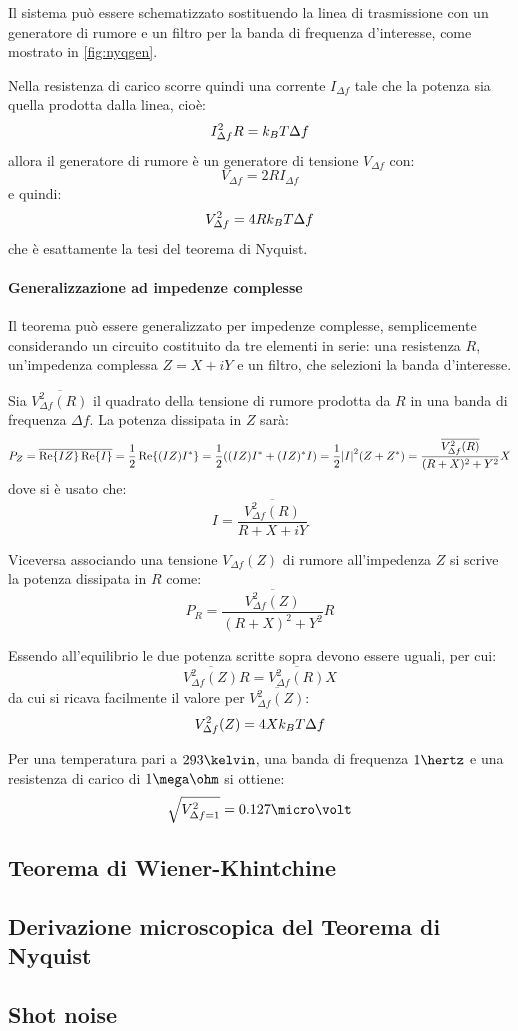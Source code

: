 Il sistema può essere schematizzato sostituendo la linea di trasmissione con un generatore di rumore e un filtro per la banda di frequenza d'interesse, come mostrato in \cref{fig:nyqgen}.

Nella resistenza di carico scorre quindi una corrente $ I_{\Delta f} $ tale che la potenza sia quella prodotta dalla linea, cioè:
\[ I_{\Delta f}^2 R = k_B T \Delta f \]
allora il generatore di rumore è un generatore di tensione $ V_{\Delta f} $ con:
\[ V_{\Delta f} = 2 R I_{\Delta f} \]
e quindi:
\[ V_{\Delta f}^2 = 4 R k_B T \Delta f \]
che è esattamente la tesi del teorema di Nyquist.

\paragraph{Generalizzazione ad impedenze complesse} Il teorema può essere generalizzato per impedenze complesse, semplicemente considerando un circuito costituito da tre elementi in serie: una resistenza $ R $, un'impedenza complessa $ Z = X + i Y $ e un filtro, che selezioni la banda d'interesse.

Sia $ \overline{V_{\Delta f}^2(R)} $ il quadrato della tensione di rumore prodotta da $ R $ in una banda di frequenza $ \Delta f $. La potenza dissipata in $ Z $ sarà:
\[ P_Z = \overline{\Re\{IZ\} \Re\{I\}} = \frac{1}{2} \Re\{(IZ) I^\ast\} = \frac{1}{2} ((IZ) I^\ast + (IZ)^\ast I) = \frac{1}{2}\abs{I}^2 (Z + Z^\ast) = \frac{\overline{V_{\Delta f}^2(R)}}{(R+X)^2 + Y^2}X\]
dove si è usato che:
\[ I = \frac{\overline{V_{\Delta f}^2(R)}}{R + X +iY} \]

Viceversa associando una tensione $ V_{\Delta f}(Z) $ di rumore all'impedenza $ Z $ si scrive la potenza dissipata in $ R $ come:
\[  P_R = \frac{\overline{V_{\Delta f}^2(Z)}}{(R+X)^2 + Y^2}R \]

Essendo all'equilibrio le due potenza scritte sopra devono essere uguali, per cui:
\[ \overline{V_{\Delta f}^2(Z)} R = \overline{V_{\Delta f}^2(R)} X \]
da cui si ricava facilmente il valore per $ \overline{V_{\Delta f}^2(Z)} $:
\[ V_{\Delta f}^2(Z) = 4 X k_B T \Delta f\]

\begin{es}
	Per una temperatura pari a $ 293 \kelvin $, una banda di frequenza $ 1 \hertz $ e una resistenza di carico di $ 1 \mega\ohm $ si ottiene:
	\[ \sqrt{V_{\Delta f = 1}^2} = 0.127 \micro\volt \]
\end{es}

\subsection{Teorema di Wiener-Khintchine}

\subsection{Derivazione microscopica del Teorema di Nyquist}

\subsection{Shot noise}